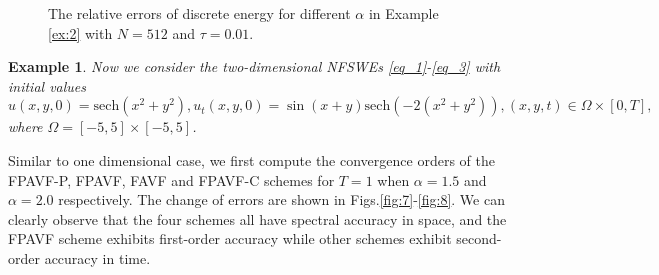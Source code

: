 \documentclass[preprint,compress,3p,10pt,fleqn]{elsarticle}
\numberwithin{equation}{section}
\newtheorem{expl}{Example}[section]
\newenvironment{example}{\begin{expl}\rm}{\end{expl}}
\begin{document}
\begin{figure}[H]
\begin{center}
  \caption{The relative errors of discrete energy for different $\alpha$ in Example \ref{ex:2} with $N = 512$ and $\tau=0.01$.} \label{fig:6}
\end{center}
\end{figure}



\begin{example}\label{ex:4}
Now we consider the two-dimensional NFSWEs \eqref{eq_1}-\eqref{eq_3} with initial values
\begin{equation}\label{eq_110}
u(x,y, 0)=\mbox{sech}\left(x^2+y^2\right), u_t(x,y, 0)=\sin (x+y) \mbox{sech}\left(-2(x^2+y^2)\right), (x,y,t)\in  \Omega\times[0, T],
\end{equation}
where $\Omega=[-5,5] \times[-5,5]$.
\end{example}


Similar to one dimensional case, we first compute the convergence orders of the FPAVF-P, FPAVF, FAVF and FPAVF-C schemes for $T=1$ when $\alpha=1.5$ and $\alpha=2.0$ respectively. The change of errors are shown in Figs.\ref{fig:7}-\ref{fig:8}. We can clearly observe that the four schemes all have spectral accuracy in space, and the FPAVF scheme exhibits first-order accuracy while other schemes exhibit second-order accuracy in time.
\end{document}
